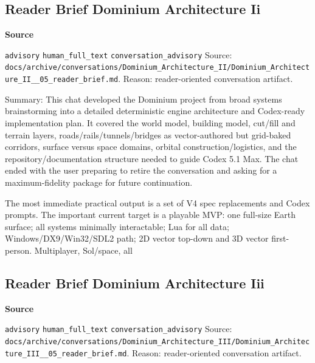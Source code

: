 \documentclass[9pt,a4paper,openany]{book}
\newcommand{\vonecallout}[3]{\par\medskip\noindent\begingroup\setlength{\fboxsep}{7pt}\colorbox{DomCalloutBg}{\parbox{0.94\linewidth}{\textbf{\textcolor{#1}{#2}}\par #3}}\endgroup\par\medskip}
\begin{document}
\subsection{Reader Brief Dominium Architecture Ii}

\vonecallout{DomSlate}{Source}{\texttt{advisory} \texttt{human\_\allowbreak{}full\_\allowbreak{}text} \texttt{conversation\_\allowbreak{}advisory} Source: \texttt{docs/\allowbreak{}archive/\allowbreak{}conversations/\allowbreak{}Dominium\_\allowbreak{}Architecture\_\allowbreak{}II/\allowbreak{}Dominium\_\allowbreak{}Architecture\_\allowbreak{}II\_\allowbreak{}\_\allowbreak{}05\_\allowbreak{}reader\_\allowbreak{}brief.\allowbreak{}md}.\allowbreak{} Reason: reader-\allowbreak{}oriented conversation artifact.\allowbreak{}}

Summary: This chat developed the Dominium project from broad systems brainstorming into a detailed deterministic engine architecture and Codex-\allowbreak{}ready implementation plan.\allowbreak{} It covered the world model, building model, cut/\allowbreak{}fill and terrain layers, roads/\allowbreak{}rails/\allowbreak{}tunnels/\allowbreak{}bridges as vector-\allowbreak{}authored but grid-\allowbreak{}baked corridors, surface versus space domains, orbital construction/\allowbreak{}logistics, and the repository/\allowbreak{}documentation structure needed to guide Codex 5.\allowbreak{}1 Max.\allowbreak{} The chat ended with the user preparing to retire the conversation and asking for a maximum-\allowbreak{}fidelity package for future continuation.\allowbreak{}


The most immediate practical output is a set of V4 spec replacements and Codex prompts.\allowbreak{} The important current target is a playable MVP: one full-\allowbreak{}size Earth surface; all systems minimally interactable; Lua for all data; Windows/\allowbreak{}DX9/\allowbreak{}Win32/\allowbreak{}SDL2 path; 2D vector top-\allowbreak{}down and 3D vector first-\allowbreak{}person.\allowbreak{} Multiplayer, Sol/\allowbreak{}space, all



\subsection{Reader Brief Dominium Architecture Iii}

\vonecallout{DomSlate}{Source}{\texttt{advisory} \texttt{human\_\allowbreak{}full\_\allowbreak{}text} \texttt{conversation\_\allowbreak{}advisory} Source: \texttt{docs/\allowbreak{}archive/\allowbreak{}conversations/\allowbreak{}Dominium\_\allowbreak{}Architecture\_\allowbreak{}III/\allowbreak{}Dominium\_\allowbreak{}Architecture\_\allowbreak{}III\_\allowbreak{}\_\allowbreak{}05\_\allowbreak{}reader\_\allowbreak{}brief.\allowbreak{}md}.\allowbreak{} Reason: reader-\allowbreak{}oriented conversation artifact.\allowbreak{}}
\end{document}
